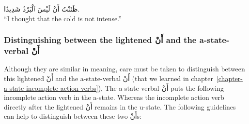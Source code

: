 \documentclass[
  10pt,
]{book}
\begin{document}
\foreignlanguage{arabic}{ظَنَنْتُ أَنْ لَيْسَ ٱلْبَرْدُ شَدِيدًا.}\\
\enquote{I thought that the cold is not intense.}

\subsubsection{\texorpdfstring{Distinguishing between the lightened \foreignlanguage{arabic}{أَنْ} and the a-state-verbal \foreignlanguage{arabic}{أَنْ}}{Distinguishing between the lightened أَنْ and the a-state-verbal أَنْ}}\label{distinguishing-between-the-lightened-ux623ux646-and-the-a-state-verbal-ux623ux646}

Although they are similar in meaning,
care must be taken to distinguish between this lightened \foreignlanguage{arabic}{أَنْ} and the a-state-verbal \foreignlanguage{arabic}{أَنْ}
(that we learned in chapter~\ref{chapter-a-state-incomplete-action-verbs}),
The a-state-verbal \foreignlanguage{arabic}{أَنْ} puts the following incomplete action verb in the a-state.
Whereas the incomplete action verb directly after the lightened \foreignlanguage{arabic}{أَنْ} remains in the u-state.
The following guidelines can help to distinguish between these two \foreignlanguage{arabic}{أَنْ}s:
\end{document}
